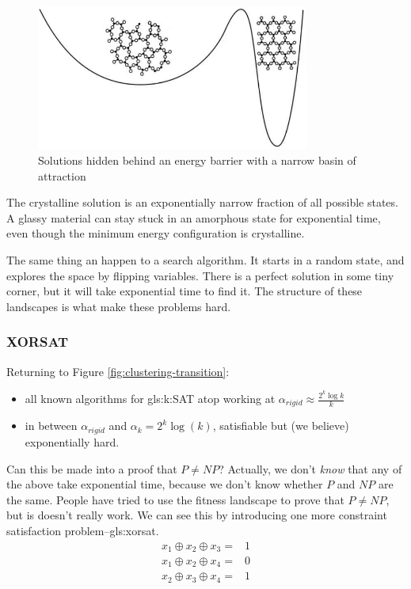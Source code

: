 \documentclass[]{article}
\begin{document}
\begin{figure}[H]
	\begin{center}
		\caption[Solution hidden behind an energy barrier]{Solutions hidden behind an energy barrier with a narrow basin of attraction}\label{fig:glass}
		\includegraphics[width=0.8\textwidth]{glass}
	\end{center}
\end{figure}

The crystalline solution is an exponentially narrow fraction of all possible states. A glassy material can stay stuck in an amorphous state for exponential time, even though the minimum energy configuration is crystalline.

The same thing an happen to a search algorithm. It starts in a random state, and explores the space by flipping variables. There is a perfect solution in some tiny corner, but it will take exponential time to find it. The structure of these landscapes is what make these problems hard.

\subsubsection{XORSAT}

Returning to Figure \ref{fig:clustering-transition}:
\begin{itemize}
	\item all known algorithms for \gls{gls:k:SAT} atop working at $\alpha_{rigid}\approx \frac{2^k \log{k}}{k}$
	\item in between $\alpha_{rigid}$ and $\alpha_k=2^k \log(k)$, satisfiable but (we believe) exponentially hard.
\end{itemize}

Can this be made into a proof that $P\ne NP$? Actually, we don't \emph{know} that any of the above take exponential time, because we don't know whether $P$ and $NP$ are the same. People have tried to use the fitness landscape to prove that $P\ne NP$, but is doesn't really work. We can see this by introducing one more constraint satisfaction problem--\gls{gls:xorsat}.
\begin{align*}
	x_1 \oplus x_2 \oplus x_3 =& 1\\
	x_1 \oplus x_2 \oplus x_4 =& 0\\
	x_2 \oplus x_3 \oplus x_4 =& 1
\end{align*}
\end{document}
